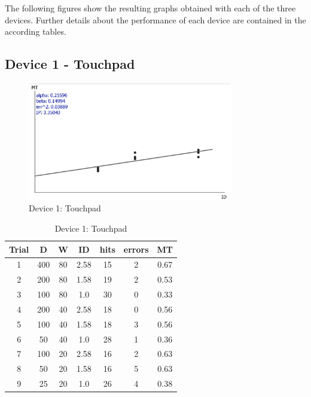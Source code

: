 \documentclass[a4paper,twoside,10pt]{article}
\begin{document}
The following figures show the resulting graphs obtained with each of the three devices. Further details about the performance of each device are contained in the according tables.

\newpage
\subsection*{Device 1 - Touchpad}
\vspace{1cm}
\begin{figure}[ht]
	\centering
		\includegraphics[width=0.80\textwidth]{Touchpad.pdf}
	\caption{Device 1: Touchpad}
	\label{fig:Touchpad}
\end{figure}
\vspace{1cm}
\begin{table}[ht]
	\centering
		\begin{tabular}{|c|c|c|c|c|c|c|}
			\hline
			Trial &	D	& W	& ID	& hits	& errors	& MT\\
			\hline
			1	& 400	& 80	& 2.58	& 15	& 2 &	0.67 \\
			\hline
			2	& 200	& 80	& 1.58	& 19	& 2	& 0.53 \\
			\hline
			3	& 100	& 80	& 1.0	& 30	& 0	& 0.33 \\
			\hline
			4	& 200	& 40	& 2.58	& 18	& 0	& 0.56 \\
			\hline
			5	& 100	& 40	& 1.58	& 18	& 3	& 0.56 \\
			\hline
			6	& 50	& 40	& 1.0	& 28	& 1 & 0.36 \\
			\hline
			7	& 100	& 20	& 2.58	& 16	& 2	& 0.63 \\
			\hline
			8	& 50	& 20	& 1.58	& 16	& 5	& 0.63 \\
			\hline
			9	& 25	& 20	& 1.0	& 26	& 4	& 0.38 \\
			\hline
		\end{tabular}
	\caption{Device 1: Touchpad}
	\label{tab:PerformanceOfTouchpad}
\end{table}
\end{document}
